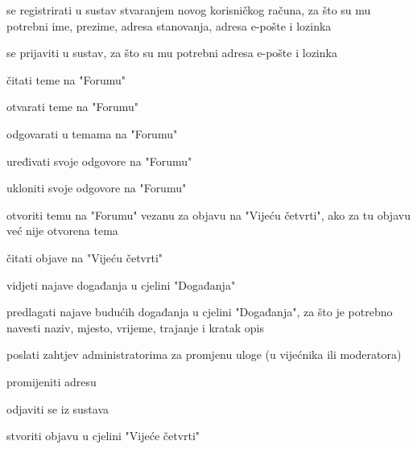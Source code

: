			
			\begin{packed_enum}
			
				\item  {}
				\begin{packed_enum}
					\item se registrirati u sustav stvaranjem novog korisničkog računa, za što su mu potrebni ime, prezime, adresa stanovanja, adresa e-pošte i lozinka
				\end{packed_enum}
				
				\item  {}
				\begin{packed_enum}
					\item se prijaviti u sustav,	za što su mu potrebni adresa e-pošte i lozinka
				\end{packed_enum}
				
				\item  {}
				\begin{packed_enum}
					\item čitati teme na "Forumu"
					\item otvarati teme na "Forumu"
					\item odgovarati u temama na "Forumu"
					\item uređivati svoje odgovore na "Forumu"
					\item ukloniti svoje odgovore na "Forumu"
					\item otvoriti temu na "Forumu" vezanu za objavu na "Vijeću četvrti", ako za tu objavu već nije otvorena tema
					\item čitati objave na "Vijeću četvrti"
					\item vidjeti najave događanja u cjelini "Događanja"
					\item predlagati najave budućih događanja u cjelini "Događanja", za što je potrebno navesti naziv, mjesto, vrijeme, trajanje i kratak opis
					\item poslati zahtjev administratorima za promjenu uloge (u vijećnika ili moderatora)
					\item promijeniti adresu	
					\item odjaviti se iz sustava
				\end{packed_enum}
				
				\item  {}
				\begin{packed_enum}
					\item stvoriti objavu u cjelini "Vijeće četvrti"	
				\end{packed_enum}
				

\end{packed_enum}
